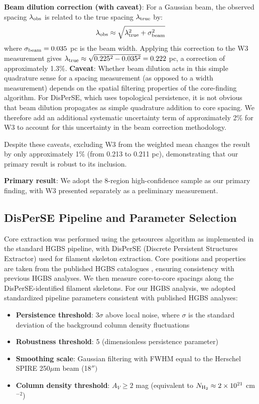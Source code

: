 \documentclass[11pt,a4paper]{article}
\begin{document}
\textbf{Beam dilution correction (with caveat)}: For a Gaussian beam, the observed spacing $\lambda_{\rm obs}$ is related to the true spacing $\lambda_{\rm true}$ by:
\begin{equation}
\lambda_{\rm obs} \approx \sqrt{\lambda_{\rm true}^2 + \sigma_{\rm beam}^2}
\end{equation}
where $\sigma_{\rm beam} = 0.035$ pc is the beam width. Applying this correction to the W3 measurement gives $\lambda_{\rm true} \approx \sqrt{0.225^2 - 0.035^2} = 0.222$ pc, a correction of approximately 1.3\%. \textbf{Caveat}: Whether beam dilution acts in this simple quadrature sense for a spacing measurement (as opposed to a width measurement) depends on the spatial filtering properties of the core-finding algorithm. For DisPerSE, which uses topological persistence, it is not obvious that beam dilution propagates as simple quadrature addition to core spacing. We therefore add an additional systematic uncertainty term of approximately 2\% for W3 to account for this uncertainty in the beam correction methodology.

Despite these caveats, excluding W3 from the weighted mean changes the result by only approximately 1\% (from 0.213 to 0.211 pc), demonstrating that our primary result is robust to its inclusion.

\textbf{Primary result}: We adopt the 8-region high-confidence sample as our primary finding, with W3 presented separately as a preliminary measurement.

\subsection{DisPerSE Pipeline and Parameter Selection}

Core extraction was performed using the getsources algorithm \citep{Men'shchikov2012} as implemented in the standard HGBS pipeline, with DisPerSE (Discrete Persistent Structures Extractor) \citep{Sousbie2011} used for filament skeleton extraction. Core positions and properties are taken from the published HGBS catalogues \citep{Konyves2015, Konyves2020, Andre2016}, ensuring consistency with previous HGBS analyses. We then measure core-to-core spacings along the DisPerSE-identified filament skeletons. For our HGBS analysis, we adopted standardized pipeline parameters consistent with published HGBS analyses:

\begin{itemize}
    \item \textbf{Persistence threshold}: $3\sigma$ above local noise, where $\sigma$ is the standard deviation of the background column density fluctuations
    \item \textbf{Robustness threshold}: 5 (dimensionless persistence parameter)
    \item \textbf{Smoothing scale}: Gaussian filtering with FWHM equal to the Herschel SPIRE 250$\mu$m beam (18$'')$
    \item \textbf{Column density threshold}: $A_V \geq 2$ mag (equivalent to $N_{\rm H_2} \approx 2 \times 10^{21}$ cm$^{-2}$)
\end{itemize}
\end{document}
